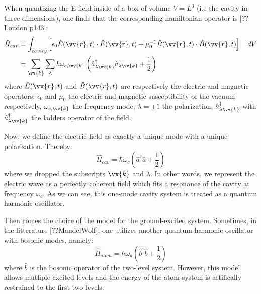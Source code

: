 \documentclass[10pt]{report}
\begin{document}
When quantizing the E-field inside of a box of volume $V = L^3$ (i.e the cavity in three dimensions), one finds that the corresponding hamiltonian operator is [??Loudon p143]:
\begin{align}
\hat{H}_{cav} &= \int_{cavity} \left[\epsilon_0 \hat{E}(\vv{r}, t) \cdot \hat{E}(\vv{r}, t) + \mu_0^{-1} \hat{B}(\vv{r}, t) \cdot \hat{B}(\vv{r}, t)\right] \quad dV\\
&= \sum_{\vv{k}} \sum_{\lambda} \hbar \omega_{c,\vv{k}} \left( \hat{a}_{\lambda \vv{k}}^\dag \hat{a}_{\lambda \vv{k}} + \frac{1}{2} \right)
\end{align}
where $\hat{E}(\vv{r}, t)$ and $\hat{B}(\vv{r}, t)$ are respectively the electric and magnetic operators; $\epsilon_0$ and $\mu_0$ the electric and magnetic susceptibility of the vacuum respectively, $\omega_{c,\vv{k}}$ the frequency mode; $\lambda=\pm 1$ the polarization; $\hat{a}_{\lambda \vv{k}}^\dag$ with $\hat{a}_{\lambda \vv{k}}^\dag$ the ladders operator of the field.

Now, we define the electric field as exactly a unique mode with a unique polarization. Thereby:
\begin{equation}
\hat{H}_{cav} = \hbar \omega_c \left( \hat{a}^\dag \hat{a} + \frac{1}{2} \right)
\end{equation}
where we dropped the subscripts $\vv{k}$ and $\lambda$. In other words, we represent the electric wave as a perfectly coherent field which fits a resonance of the cavity at frequency $\omega_c$. As we can see, this one-mode cavity system is treated as a quantum harmonic oscillator.

Then comes the choice of the model for the ground-excited system. Sometimes, in the litterature [??MandelWolf], one utilizes another quantum harmonic oscillator with bosonic modes, namely:
\begin{equation}
\label{sec_bosonic_mw}
\hat{H}_{atom} = \hbar \omega_a \left( \hat{b}^\dag \hat{b} + \frac{1}{2} \right)
\end{equation}
where $\hat{b}$ is the bosonic operator of the two-level system. However, this model allows mutliple excited levels and the energy of the atom-system is artifically restrained to the first two levels.
\end{document}
